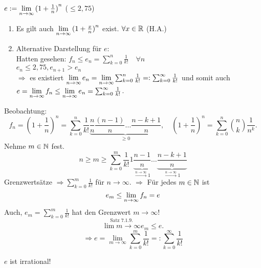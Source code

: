 \documentclass[../ana1.tex]{subfiles}
\begin{document}
\begin{defi}
	\( e:= \lim\limits_{n\rightarrow\infty} {(1+\frac{1}{n})}^n \) (\(\leq 2,75\))
\end{defi}
\begin{bem}
	\begin{enumerate}
		\item Es gilt auch \( \lim\limits_{n\rightarrow\infty} {(1+\frac{x}{n})}^n \) exist. \( \forall x\in\mathbb{R} \) (H.A.)
		\item Alternative Darstellung für \(e\):\\
		Hatten gesehen: \(f_n \leq e_n = \sum_{k=0}^{n} \frac{1}{k!} \quad \forall n \) \\
		\(e_n \leq 2,75, e_{n+1} > e_n \) \\
		\( \Rightarrow \) es existiert \( \lim\limits_{n\rightarrow\infty} e_n = \lim\limits_{n\rightarrow\infty} \sum_{k=0}^{n} \frac{1}{k!} =: \sum_{k=0}^{\infty} \frac{1}{k!} \) und somit auch \(e = \lim\limits_{n\rightarrow\infty} f_n\leq \lim\limits_{n\rightarrow\infty} e_n = \sum_{k=0}^{\infty} \frac{1}{k!} \).
	\end{enumerate}
	Beobachtung: 
	\[ f_n = {\left(1+\frac{1}{n}\right)}^n = \sum_{k=0}^{n} \frac{1}{k!} \underbrace{\frac{n}{n}\frac{(n-1)}{n} \ldots\frac{n-k+1}{n}}_{\geq 0} , \quad {\left(1+\frac{1}{n}\right)}^n = \sum_{k=0}^{n} \binom{n}{k} \frac{1}{n^k}. \]
	Nehme \(m\in\mathbb{N} \) fest.
	\[ n\geq m \geq \sum_{k=0}^{m} \frac{1}{k!} 1 \underbrace{\frac{n-1}{n}}_{\overset{n\rightarrow\infty}{\rightarrow} 1} \ldots \underbrace{\frac{n-k+1}{n}}_{\overset{n\rightarrow\infty}{\rightarrow} 1} \]
	Grenzwertsätze \(\Rightarrow \sum_{k=0}^{m} \frac{1}{k!} \) für \(n\rightarrow\infty \).
	\( \Rightarrow \) Für jedes \(m\in\mathbb{N} \) ist
	\[e_m \leq \lim\limits_{n\rightarrow\infty} f_n = e \]
	Auch, \(e_m = \sum_{k=0}^{m} \frac{1}{k!} \) hat den Grenzwert \(m\rightarrow\infty \)!
	\[ \overset{\text{Satz 7.1.9.}}{\lim\limits{m\rightarrow\infty}} e_m \leq e. \]
	\[\Rightarrow e = \lim\limits_{m\rightarrow\infty} \sum_{k=0}^{m} \frac{1}{k!} =: \sum_{k=0}^{\infty} \frac{1}{k!} \]
\end{bem}
\begin{satz} 
	\(e\) ist irrational!
\end{satz}
\end{document}
